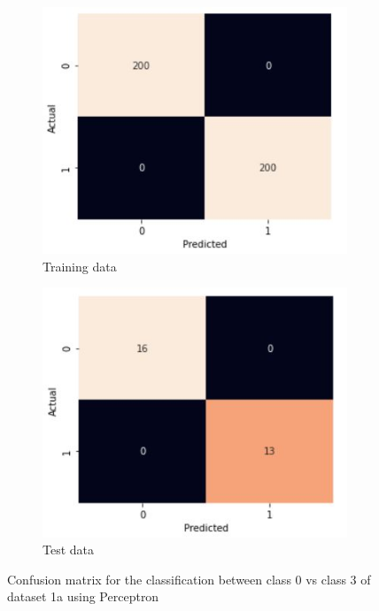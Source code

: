 \documentclass[11pt]{article}
\begin{document}
\begin{figure}
\centering
	\begin{subfigure}[b]{0.45\textwidth}
	\centering
	\includegraphics[scale=0.4]{dataset1a_perceptron_03_cm_train.jpg}
	\caption{Training data}
	\label{fig:fig1.1.3.1}
	\end{subfigure}
	\begin{subfigure}[b]{0.45\textwidth}
	\centering
	\includegraphics[scale=0.4]{dataset1a_perceptron_03_cm_test.jpg}
	\caption{Test data}
	\label{fig:fig1.1.3.2}
	\end{subfigure}
\caption{Confusion matrix for the classification between class 0 vs class 3 of dataset 1a using Perceptron}
\label{fig:fig1.1.3}
\end{figure}
\end{document}
